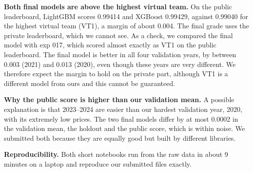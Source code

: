 \textbf{Both final models are above the highest virtual team.} On the public leaderboard, LightGBM scores 0.99414 and XGBoost 0.99429, against 0.99040 for the highest virtual team (VT1), a margin of about 0.004. The final grade uses the private leaderboard, which we cannot see. As a check, we compared the final model with exp 017, which scored almost exactly as VT1 on the public leaderboard. The final model is better in all four validation years, by between 0.003 (2021) and 0.013 (2020), even though these years are very different. We therefore expect the margin to hold on the private part, although VT1 is a different model from ours and this cannot be guaranteed.

\textbf{Why the public score is higher than our validation mean.} A possible explanation is that 2023--2024 are easier than our hardest validation year, 2020, with its extremely low prices. The two final models differ by at most 0.0002 in the validation mean, the holdout and the public score, which is within noise. We submitted both because they are equally good but built by different libraries.

\textbf{Reproducibility.} Both short notebooks run from the raw data in about 9 minutes on a laptop and reproduce our submitted files exactly.
